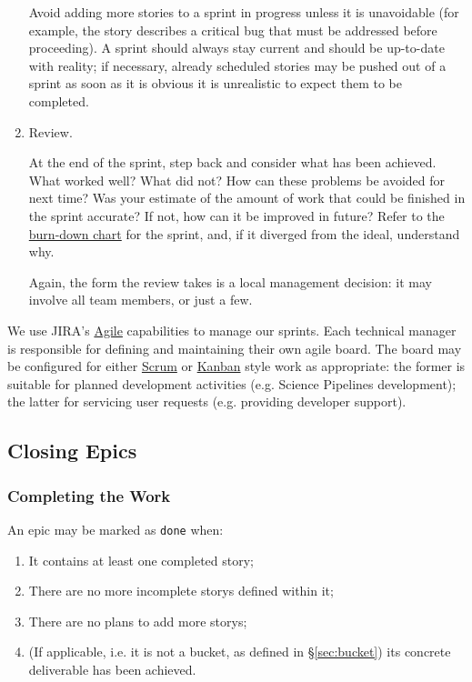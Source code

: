 \begin{enumerate}
  Avoid adding more stories to a sprint in progress unless it is
  unavoidable (for example, the \gls{story} describes a critical bug that must
  be addressed before proceeding). A sprint should always stay current
  and should be up-to-date with reality; if necessary, already scheduled
  stories may be pushed out of a sprint as soon as it is obvious it is
  unrealistic to expect them to be completed.
\item
  \gls{Review}.

  At the end of the sprint, step back and consider what has been
  achieved. What worked well? What did not? How can these problems be
  avoided for next time? Was your estimate of the amount of work that
  could be finished in the sprint accurate? If not, how can it be
  improved in future? Refer to the
  \href{https://en.wikipedia.org/wiki/Burn_down_chart}{burn-down chart}
  for the sprint, and, if it diverged from the ideal, understand why.

  Again, the form the review takes is a local management decision: it
  may involve all team members, or just a few.
\end{enumerate}

We use \gls{JIRA}'s
\href{https://www.atlassian.com/software/jira/agile}{Agile} capabilities
to manage our sprints. Each technical manager is responsible for
defining and maintaining their own agile board. The board may be
configured for either
\href{https://en.wikipedia.org/wiki/Scrum_(software_development)}{Scrum}
or \href{https://en.wikipedia.org/wiki/Kanban_(development)}{Kanban}
style work as appropriate: the former is suitable for planned
development activities (e.g. \gls{Science Pipelines} development); the latter
for servicing user requests (e.g. providing developer support).

\subsection{Closing Epics}
\label{sec:epic-close}

\subsubsection{Completing the Work}
\label{sec:epic-done}

An \gls{epic} may be marked as \texttt{done} when:

\begin{enumerate}
\item
  It contains at least one completed \gls{story};
\item
  There are no more incomplete \glspl{story} defined within it;
\item
  There are no plans to add more \glspl{story};
\item
  (If applicable, i.e. it is not a bucket, as defined in \S\ref{sec:bucket}) its concrete deliverable has been achieved.
\end{enumerate}

